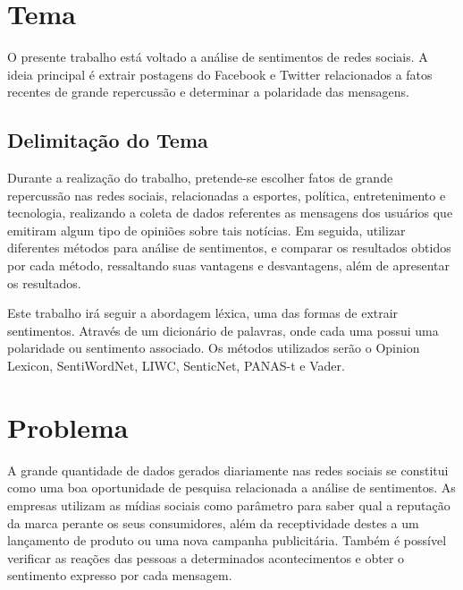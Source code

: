 \documentclass[12pt,article,a4paper,brazil,oldfontcommands,oneside]{abntex2}
\begin{document}
\frenchspacing 		%
\maketitle			%


\section{Tema}

O presente trabalho está voltado a análise de sentimentos de redes sociais. A ideia principal é extrair postagens do Facebook e Twitter relacionados a fatos recentes de grande repercussão e determinar a polaridade das mensagens.

\subsection{Delimitação do Tema}

Durante a realização do trabalho, pretende-se escolher fatos de grande repercussão nas redes sociais, relacionadas a esportes, política, entretenimento e tecnologia, realizando a coleta de dados referentes as mensagens dos usuários que emitiram algum tipo de opiniões sobre tais notícias. Em seguida, utilizar diferentes métodos para análise de sentimentos, e comparar os resultados obtidos por cada método, ressaltando suas vantagens e desvantagens, além de apresentar os resultados. 

Este trabalho irá seguir a abordagem léxica, uma das formas de extrair sentimentos. Através de um dicionário de palavras, onde cada uma possui uma polaridade ou sentimento associado. \cite{taboada2011lexicon} Os métodos utilizados serão o Opinion Lexicon, SentiWordNet, LIWC, SenticNet, PANAS-t e Vader. \cite{benevenuto2015metodos}

\section{Problema}

A grande quantidade de dados gerados diariamente nas redes sociais se constitui como uma boa oportunidade de pesquisa relacionada a análise de sentimentos. As empresas utilizam as mídias sociais como parâmetro para saber qual a reputação da marca perante os seus consumidores, além da receptividade destes a um lançamento de produto ou uma nova campanha publicitária. Também é possível verificar as reações das pessoas a determinados acontecimentos e obter o sentimento expresso por cada mensagem.
\end{document}
